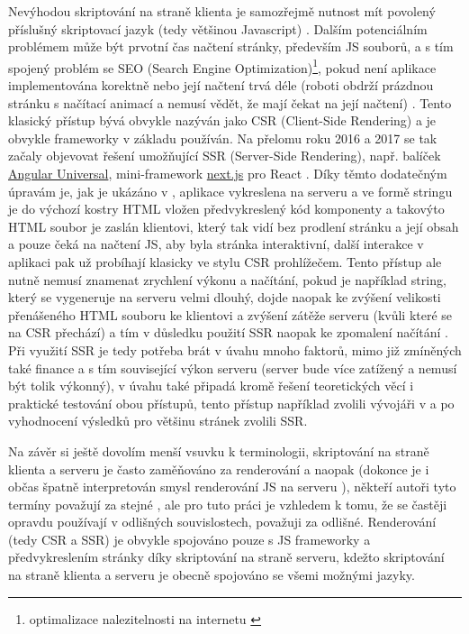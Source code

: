         Nevýhodou skriptování na straně klienta je samozřejmě nutnost mít povolený příslušný skriptovací jazyk (tedy většinou Javascript) \cite{scripting-sqa}. Dalším potenciálním problémem může být prvotní čas načtení stránky, především JS souborů, a s tím spojený problém se SEO (Search Engine Optimization)\footnote{optimalizace nalezitelnosti na internetu \cite{seo}}, pokud není aplikace implementována korektně nebo její načtení trvá déle (roboti obdrží prázdnou stránku s načítací animací a nemusí vědět, že mají čekat na její načtení) \cite{scripting-freecodecamp,scripting-hackernoon}. Tento klasický přístup bývá obvykle nazýván jako CSR (Client-Side Rendering) a je obvykle frameworky v základu používán. Na přelomu roku 2016 a 2017 se tak začaly objevovat řešení umožňující SSR (Server-Side Rendering), např. balíček \href{https://github.com/angular/universal}{Angular Universal}, mini-framework \href{https://github.com/zeit/next.js/}{next.js} pro React \cite{scripting-hackernoon}. Díky těmto dodatečným úpravám je, jak je ukázáno v \cite{scripting-ytb}, aplikace vykreslena na serveru a ve formě stringu je do výchozí kostry HTML vložen předvykreslený kód komponenty a takovýto HTML soubor je zaslán klientovi, který tak vidí bez prodlení stránku a její obsah a pouze čeká na načtení JS, aby byla stránka interaktivní, další interakce v aplikaci pak už probíhají klasicky ve stylu CSR prohlížečem. Tento přístup ale nutně nemusí znamenat zrychlení výkonu a načítání, pokud je například string, který se vygeneruje na serveru velmi dlouhý, dojde naopak ke zvýšení velikosti přenášeného HTML souboru ke klientovi a zvýšení zátěže serveru (kvůli které se na CSR přechází) a tím v důsledku použití SSR naopak ke zpomalení načítání \cite{scripting-hackernoon}. Při využití SSR je tedy potřeba brát v úvahu mnoho faktorů, mimo již zmíněných také finance a s tím související výkon serveru (server bude více zatížený a nemusí být tolik výkonný), v úvahu také připadá kromě řešení teoretických věcí i praktické testování obou přístupů, tento přístup například zvolili vývojáři v \cite{scripting-benchmark} a po vyhodnocení výsledků pro většinu stránek zvolili SSR.
        
        Na závěr si ještě dovolím menší vsuvku k terminologii, skriptování na straně klienta a serveru je často zaměňováno za renderování a naopak (dokonce je i občas špatně interpretován smysl renderování JS na serveru \cite{scripting-chyby}), někteří autoři tyto termíny považují za stejné \cite{scripting-freecodecamp}, ale pro tuto práci je vzhledem k tomu, že se častěji opravdu používají v odlišných souvislostech, považuji za odlišné. Renderování (tedy CSR a SSR) je obvykle spojováno pouze s JS frameworky a předvykreslením stránky díky skriptování na straně serveru, kdežto skriptování na straně klienta a serveru je obecně spojováno se všemi možnými jazyky.
    
